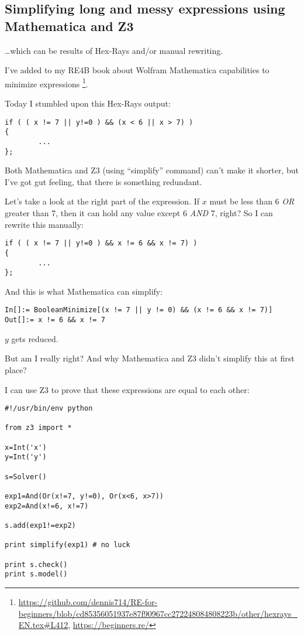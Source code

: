 \subsection{Simplifying long and messy expressions using Mathematica and Z3}

\dots which can be results of Hex-Rays and/or manual rewriting.

I've added to my RE4B book about Wolfram Mathematica capabilities to minimize expressions
\footnote{\url{https://github.com/dennis714/RE-for-beginners/blob/cd85356051937e87f90967cc272248084808223b/other/hexrays_EN.tex\#L412}, \url{https://beginners.re/}}.

Today I stumbled upon this Hex-Rays output:

\begin{lstlisting}
if ( ( x != 7 || y!=0 ) && (x < 6 || x > 7) )
{
        ...
};
\end{lstlisting}

Both Mathematica and Z3 (using ``simplify'' command) can't make it shorter, but I've got gut feeling,
that there is something redundant.

Let's take a look at the right part of the expression.
If $x$ must be less than 6 \textit{OR} greater than 7, then it can hold any value except 6 \textit{AND} 7, right?
So I can rewrite this manually:

\begin{lstlisting}
if ( ( x != 7 || y!=0 ) && x != 6 && x != 7) )
{
        ...
};
\end{lstlisting}

And this is what Mathematica can simplify:

\begin{lstlisting}
In[]:= BooleanMinimize[(x != 7 || y != 0) && (x != 6 && x != 7)]
Out[]:= x != 6 && x != 7
\end{lstlisting}

$y$ gets reduced.

But am I really right?
And why Mathematica and Z3 didn't simplify this at first place?

I can use Z3 to prove that these expressions are equal to each other:

\begin{lstlisting}
#!/usr/bin/env python

from z3 import *

x=Int('x')
y=Int('y')

s=Solver()

exp1=And(Or(x!=7, y!=0), Or(x<6, x>7))
exp2=And(x!=6, x!=7)

s.add(exp1!=exp2)

print simplify(exp1) # no luck

print s.check()
print s.model()
\end{lstlisting}

